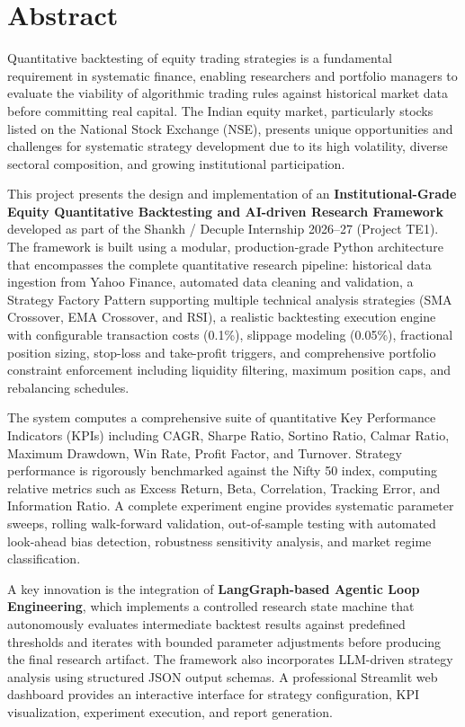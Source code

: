 \vspace{1in}
\chapter*{Abstract}

Quantitative backtesting of equity trading strategies is a fundamental requirement in systematic finance, enabling researchers and portfolio managers to evaluate the viability of algorithmic trading rules against historical market data before committing real capital. The Indian equity market, particularly stocks listed on the National Stock Exchange (NSE), presents unique opportunities and challenges for systematic strategy development due to its high volatility, diverse sectoral composition, and growing institutional participation.

This project presents the design and implementation of an \textbf{Institutional-Grade Equity Quantitative Backtesting and AI-driven Research Framework} developed as part of the Shankh / Decuple Internship 2026--27 (Project TE1). The framework is built using a modular, production-grade Python architecture that encompasses the complete quantitative research pipeline: historical data ingestion from Yahoo Finance, automated data cleaning and validation, a Strategy Factory Pattern supporting multiple technical analysis strategies (SMA Crossover, EMA Crossover, and RSI), a realistic backtesting execution engine with configurable transaction costs (0.1\%), slippage modeling (0.05\%), fractional position sizing, stop-loss and take-profit triggers, and comprehensive portfolio constraint enforcement including liquidity filtering, maximum position caps, and rebalancing schedules.

The system computes a comprehensive suite of quantitative Key Performance Indicators (KPIs) including CAGR, Sharpe Ratio, Sortino Ratio, Calmar Ratio, Maximum Drawdown, Win Rate, Profit Factor, and Turnover. Strategy performance is rigorously benchmarked against the Nifty 50 index, computing relative metrics such as Excess Return, Beta, Correlation, Tracking Error, and Information Ratio. A complete experiment engine provides systematic parameter sweeps, rolling walk-forward validation, out-of-sample testing with automated look-ahead bias detection, robustness sensitivity analysis, and market regime classification.

A key innovation is the integration of \textbf{LangGraph-based Agentic Loop Engineering}, which implements a controlled research state machine that autonomously evaluates intermediate backtest results against predefined thresholds and iterates with bounded parameter adjustments before producing the final research artifact. The framework also incorporates LLM-driven strategy analysis using structured JSON output schemas. A professional Streamlit web dashboard provides an interactive interface for strategy configuration, KPI visualization, experiment execution, and report generation.
